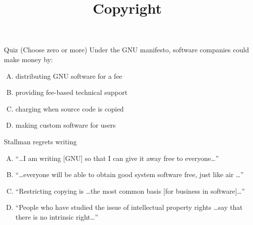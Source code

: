 \documentclass{beamer}
\title{Copyright}
\date{}
\begin{document}
\begin{frame}
\titlepage
\end{frame}

\begin{frame}{Quiz \hfill (Choose zero or more)}
Under the GNU manifesto, software companies could make money by:
\begin{enumerate}[(A)]
\item<1-2> distributing GNU software for a fee
\item<1-2> providing fee-based technical support
\item<1> charging when source code is copied
\item<1-2> making custom software for users
\end{enumerate}
\medskip
Stallman regrets writing
\begin{enumerate}[(A)]
\item<1-2> ``\ldots I am writing [GNU] so that I can give it away free to everyone\ldots''
\item<1-2> ``\ldots everyone will be able to obtain good system software free, just like air \ldots''
\item<1-2> ``Restricting copying is \ldots the most common basis [for business in software]\ldots''
\item<1-2> ``People who have studied the issue of intellectual property rights \ldots say that there is no intrinsic right\ldots''
\end{enumerate}
\end{frame}
\end{document}
